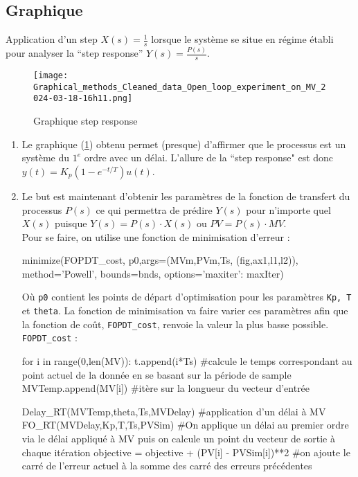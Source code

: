 \documentclass{article}
\begin{document}
\subsection{Graphique}
Application d'un step $X(s) = \frac{1}{s}$ lorsque le système se situe en régime établi pour analyser la ``step response'' $Y(s) = \frac{P(s)}{s}$.
\begin{figure}[h]
    \centering
    \texttt{[image: Graphical\_methods\_Cleaned\_data\_Open\_loop\_experiment\_on\_MV\_2024-03-18-16h11.png]}
    \caption{Graphique step response}
    \label{fig:Graph1}
\end{figure}
\begin{enumerate}
    \item Le graphique (\ref{fig:Graph1}) obtenu permet (presque) d'affirmer que le processus est un système du $1^{e}$ ordre avec un délai. L'allure de la ``step response" est donc $y(t) = K_p (1-e^{-t/T})u(t)$.

    \item Le but est maintenant d'obtenir les paramètres de la fonction de transfert du processus $P(s)$ ce qui permettra de prédire $Y(s)$ pour n'importe quel $X(s)$ puisque $Y(s) = P(s) \cdot X(s)$ ou $PV = P(s)\cdot MV$. 
    \\Pour se faire, on utilise une fonction de minimisation d'erreur : 
    \begin{python*}
        minimize(FOPDT_cost,
            p0,args=(MVm,PVm,Ts,
            (fig,ax1,l1,l2)), 
            method='Powell',
            bounds=bnds,
            options={'maxiter': maxIter})
    \end{python*}

    Où \texttt{p0} contient les points de départ d'optimisation pour les paramètres \texttt{Kp, T} et \texttt{theta}. La fonction de minimisation va faire varier ces paramètres afin que la fonction de coût, \texttt{FOPDT\_cost}, renvoie la valeur la plus basse possible. 
    \\ \texttt{FOPDT\_cost} : 

    \begin{python*}
        for i in range(0,len(MV)):
            t.append(i*Ts) #calcule le temps correspondant au point actuel                  de la donnée en se basant sur la période de sample
            MVTemp.append(MV[i]) #itère sur la longueur du vecteur d'entrée

            Delay_RT(MVTemp,theta,Ts,MVDelay) #application d'un délai à MV  
            FO_RT(MVDelay,Kp,T,Ts,PVSim) #On applique un délai au premier ordre via le délai appliqué à MV puis on calcule un point du vecteur de sortie à chaque itération 
            objective = objective + (PV[i] - PVSim[i])**2 #on ajoute le carré de l'erreur actuel à la somme des carré des erreurs précédentes   
    \end{python*}
\end{enumerate}

    
\end{document}
